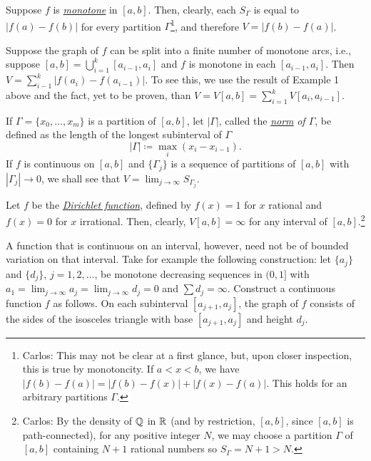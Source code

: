 \begin{example}
Suppose $f$ is
\href{https://en.wikipedia.org/wiki/Monotonic_function}{\emph{monotone}} in
$[a,b]$. Then, clearly, each $S_\Gamma$ is equal to $|f(a)-f(b)|$ for every
partition $\Gamma$\footnote{Carlos: This may not be clear at
  a first glance, but, upon closer inspection, this is true by
  monotoncity. If $a<x<b$, we have
  $|f(b)-f(a)|=|f(b)-f(x)|+|f(x)-f(a)|$. This holds for an arbitrary
  partitions $\Gamma$.}, and therefore $V=|f(b)-f(a)|$.
\end{example}
\begin{example}
Suppose the graph of $f$ can be split into a finite number of monotone
arcs, i.e., suppose $[a,b]=\bigcup_{i=1}^k [a_{i-1},a_i]$ and $f$ is
monotone in each $[a_{i-1},a_i]$. Then
$V=\sum_{i-1}^k|f(a_i)-f(a_{i-1})|$. To see this, we use the result of
Example 1 above and the fact, yet to be proven, than $V=V[a,b]=\sum_{i=1}^k
V[a_i,a_{i-1}]$.
\end{example}

If $\Gamma=\{x_0,\dotsc,x_m\}$ is a partition of $[a,b]$, let $|\Gamma|$,
called the
\href{https://en.wikipedia.org/wiki/Partition_of_an_interval#Norm_of_a_partition}{\emph{norm}}
\emph{of $\Gamma$}, be defined as the length of the longest subinterval of
$\Gamma$
\begin{equation}
\label{eq:bv:partition-norm}
|\Gamma|\coloneqq\max_{i}(x_i-x_{i-1}).
\end{equation}
If $f$ is continuous on $[a,b]$ and $\{\Gamma_j\}$ is a sequence of
partitions of $[a,b]$ with $|\Gamma_j|\to 0$, we shall see that
$V=\lim_{j\to\infty} S_{\Gamma_j}$.

\begin{example}
Let $f$ be the
\href{https://en.wikipedia.org/wiki/Dirichlet_function}{\emph{Dirichlet
    function}}, defined by $f(x)=1$ for $x$ rational and $f(x)=0$ for $x$
irrational. Then, clearly, $V[a,b]=\infty$ for any interval of
$[a,b]$.\footnote{Carlos: By the density of $\mathbb{Q}$ in $\mathbb{R}$ (and by
  restriction, $[a,b]$, since $[a,b]$ is path-connected), for any
  positive integer $N$, we may choose a partition $\Gamma$ of $[a,b]$
  containing $N+1$ rational numbers so $S_\Gamma=N+1>N$.}
\end{example}

\begin{example}
A function that is continuous on an interval, however, need not be of
bounded variation on that interval. Take for example the following
construction: let $\{a_j\}$ and $\{d_j\}$, $j=1,2,\dotsc$, be monotone
decreasing sequences in $(0,1]$ with $a_1=\lim_{j\to\infty}
a_j=\lim_{j\to\infty}d_j=0$ and $\sum d_j=\infty$. Construct a continuous
function $f$ as follows. On each subinterval $[a_{j+1},a_j]$, the graph of
$f$ consists of the sides of the isosceles triangle with base
$[a_{j+1},a_j]$ and height $d_j$.
\end{example}

